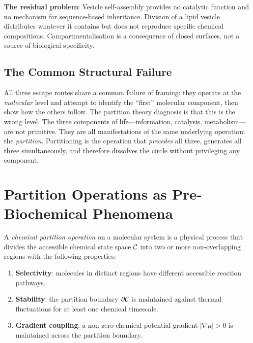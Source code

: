 \textbf{The residual problem}: Vesicle self-assembly provides no catalytic
function and no mechanism for sequence-based inheritance. Division of a lipid
vesicle distributes whatever it contains but does not reproduce specific
chemical compositions. Compartmentalisation is a consequence of closed surfaces,
not a source of biological specificity.

\subsection{The Common Structural Failure}

All three escape routes share a common failure of framing: they operate at
the \emph{molecular} level and attempt to identify the ``first'' molecular
component, then show how the others follow. The partition theory diagnosis is
that this is the wrong level. The three components of life---information,
catalysis, metabolism---are not primitive. They are all manifestations of the
same underlying operation: the \emph{partition}. Partitioning is the operation
that \emph{precedes} all three, generates all three simultaneously, and
therefore dissolves the circle without privileging any component.

\section{Partition Operations as Pre-Biochemical Phenomena}
\label{sec:prebiochem_partitioning}

\begin{definition}
\label{def:chemical_partition}
A \emph{chemical partition operation} on a molecular system is a physical
process that divides the accessible chemical state space $\mathcal{C}$ into two or
more non-overlapping regions with the following properties:
\begin{enumerate}[label=(\alph*)]
  \item \textbf{Selectivity}: molecules in distinct regions have different
        accessible reaction pathways.
  \item \textbf{Stability}: the partition boundary $\partial\mathcal{C}$ is maintained
        against thermal fluctuations for at least one chemical timescale.
  \item \textbf{Gradient coupling}: a non-zero chemical potential gradient
        $|\nabla\mu| > 0$ is maintained across the partition boundary.
\end{enumerate}
\end{definition}

